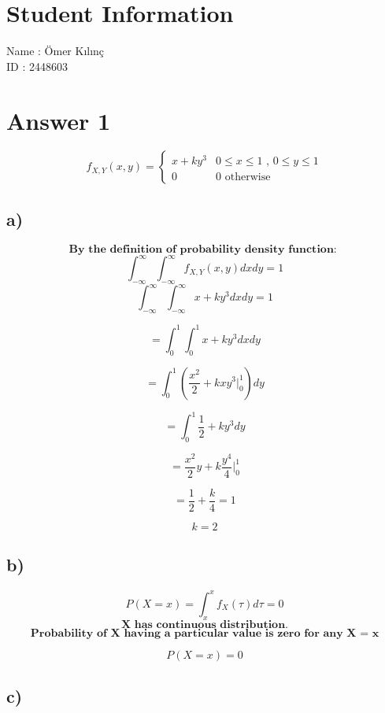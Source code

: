 \documentclass[12pt]{article}
\begin{document}
\section*{Student Information}

Name : Ömer Kılınç\\

ID : 2448603\\


\section*{Answer 1}

\begin{equation}
f_{X,Y}(x,y) =
    \begin{cases}
        x+ky^3 & 0 \leq x \leq 1 \text{ , } 0 \leq y \leq 1 \\
        0 & 0 \text{ otherwise}
    \end{cases}
\end{equation}


\subsection*{a)} 

\[\textbf{By the definition of probability density function: }\]
\[\int_{-\infty}^{\infty}\int_{-\infty}^{\infty}f_{X,Y}(x,y) dx dy = 1\]
\[\]
\[\int_{-\infty}^{\infty}\int_{-\infty}^{\infty}x+ky^3 dx dy = 1\]

\[ = \int_{0}^{1}\int_{0}^{1}x+ky^3 dx dy\]

\[ = \int_{0}^{1}(\frac{x^2}{2}+kxy^3 \Big|_0^1)dy \]

\[ = \int_{0}^{1}\frac{1}{2}+ ky^3 dy \]

\[ = \frac{x^2}{2}y+ k\frac{y^4}{4} \Big|_0^1 \]

\[ = \frac{1}{2} + \frac{k}{4} = 1 \]

\[ k = 2\]

\subsection*{b)} 

\[P(X = x) = \int_{x}^{x}f_X(\tau) d\tau = 0\]
\[ \textbf{X has continuous distribution.} \]
\[ \textbf{Probability of X having a particular value is zero for any X = x} \]

\[P(X = x) = 0 \]


\subsection*{c)} 
\end{document}

